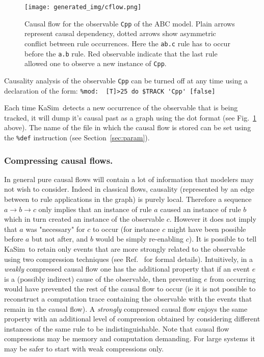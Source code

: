 \documentclass[11pt]{book}
\def\KaSim{\textsf{KaSim}}
\def\ttt#1{\texttt{#1}}
\def\rar{\rightarrow}
\def\ie{ie }
\begin{document}
\begin{figure}[htbp]
\begin{center}
\texttt{[image: generated\_img/cflow.png]}
\caption{Causal flow for the observable \ttt{{\textquotesingle}Cpp{\textquotesingle}} of the ABC model. Plain arrows represent causal dependency, dotted arrows show asymmetric conflict between rule occurrences. Here the \ttt{{\textquotesingle}ab.c{\textquotesingle}} rule has to occur before the \ttt{{\textquotesingle}a.b{\textquotesingle}} rule. Red observable indicate that the last rule allowed one to observe a new instance of \ttt{{\textquotesingle}Cpp{\textquotesingle}}.}
\label{fig:cflow}
\end{center}
\end{figure}

Causality analysis of the observable \ttt{Cpp} can be turned off at any time using a declaration of the form:
\lstinline[language=kappa]!%mod:  [T]>25 do $TRACK 'Cpp' [false]!

Each time \KaSim~detects a new occurrence of the observable that is being tracked, it will dump it's causal past as a graph using the dot format (see Fig.~\ref{fig:cflow} above). The name of the file in which the causal flow is stored can be set using the \texttt{\%def} instruction (see Section~\ref{sec:param}).

\subsubsection*{Compressing causal flows.}

In general pure causal flows will contain a lot of information that modelers may not wish to consider. Indeed in classical flows, causality (represented by an edge between to rule applications in the graph) is purely local. Therefore a sequence $a\rar b \rar c$ only implies that an instance of rule $a$ caused an instance of rule $b$ which in turn created an instance of the observable $c$. However it does not imply that $a$ was "necessary" for $c$ to occur (for instance $c$ might have been possible before $a$ but not after, and $b$ would be simply re-enabling $c$). It is possible to tell \KaSim~to retain only events that are more strongly related to the observable using two compression techniques (see Ref.~\cite{Dan_etal12} for formal details). Intuitively, in a \emph{weakly} compressed causal flow one has the additional property that if an event $e$ is a (possibly indirect) cause of the observable, then preventing $e$ from occurring would have prevented the rest of the causal flow to occur (\ie it is not possible to reconstruct a computation trace containing the observable with the events that remain in the causal flow). A \emph{strongly} compressed causal flow enjoys the same property with an additional level of compression obtained by considering different instances of the same rule to be indistinguishable. Note that causal flow compressions may be memory and computation demanding. For large systems it may be safer to start with weak compressions only.
\end{document}
